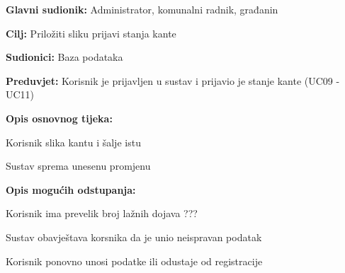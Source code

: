 				\noindent {}
					\begin{packed_item}
	
						\item \textbf{Glavni sudionik: }Administrator, komunalni radnik, građanin
						\item  \textbf{Cilj:} Priložiti sliku prijavi stanja kante
						\item  \textbf{Sudionici:} Baza podataka
						\item  \textbf{Preduvjet:} Korisnik je prijavljen u sustav i prijavio je stanje kante (UC09 - UC11)
						\item  \textbf{Opis osnovnog tijeka:}
						
						\item[] \begin{packed_enum}
	
							\item Korisnik slika kantu i šalje istu
							\item Sustav sprema unesenu promjenu
						\end{packed_enum}
						
						\item  \textbf{Opis mogućih odstupanja:}
						
						\item[] \begin{packed_item}
	
							\item[2.a] Korisnik ima prevelik broj lažnih dojava ???
							
							\item[] \begin{packed_enum}
								
								\item Sustav obavještava korsnika da je unio neispravan podatak
								\item Korisnik ponovno unosi podatke ili odustaje od registracije
								
							
							\end{packed_enum}
							
						\end{packed_item}
					\end{packed_item}


				
				
